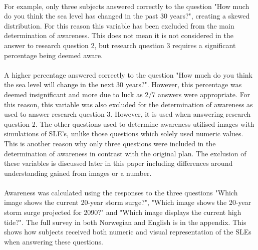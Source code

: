 \paragraph{}
For example, only three subjects answered correctly to the question "How much do you think the sea level has changed in the past 30 years?", creating a skewed distribution. For this reason this variable has been excluded from the main determination of awareness. This does not mean it is not considered in the answer to research question 2, but research question 3 requires a significant percentage being deemed aware. 
\paragraph{}
A higher percentage answered correctly to the question "How much do you think the sea level will change in the next 30 years?". However, this percentage was deemed insignificant and more due to luck as 2/7 answers were appropriate. For this reason, this variable was also excluded for the determination of awareness as used to answer research question 3. However, it is used when answering research question 2. The other questions used to determine awareness utilised images with simulations of SLE's, unlike those questions which solely used numeric values. This is another reason why only three questions were included in the determination of awareness in contrast with the original plan. The exclusion of these variables is discussed later in this paper including differences around understanding gained from images or a number.
\paragraph{}
Awareness was calculated using the responses to the three questions "Which image shows the current 20-year storm surge?", "Which image shows the 20-year storm surge projected for 2090?" and "Which image displays the current high tide?". The full survey in both Norwegian and English is in the appendix. This shows how subjects received both numeric and visual representation of the SLEs when answering these questions. 



